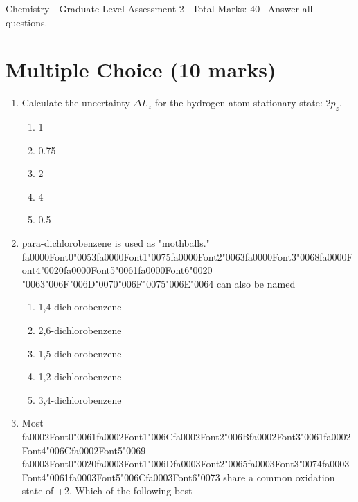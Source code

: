 \documentclass[12pt]{article}
\begin{document}
\begin{center}
Chemistry - Graduate Level Assessment 2 \
Total Marks: 40 \
Answer all questions.
\end{center}

\section*{Multiple Choice (10 marks)}
\begin{enumerate}[label=\arabic*.]
\item Calculate the uncertainty $\Delta L_z$ for the hydrogen-atom stationary state: $2 p_z$.
\begin{enumerate}[label=(\alph*)]
    \item 1
    \item 0.75
    \item 2
    \item 4
    \item 0.5
\end{enumerate}
\item para-dichlorobenzene is used as "mothballs." {\csname fa0000Font0\endcsname\char"0053}{\csname fa0000Font1\endcsname\char"0075}{\csname fa0000Font2\endcsname\char"0063}{\csname fa0000Font3\endcsname\char"0068}{\csname fa0000Font4\endcsname\char"0020}{\csname fa0000Font5\endcsname\char"0061}{\csname fa0000Font6\endcsname\char"0020} {\char"0063}{\char"006F}{\char"006D}{\char"0070}{\char"006F}{\char"0075}{\char"006E}{\char"0064} can also be named
\begin{enumerate}[label=(\alph*)]
    \item 1,4-dichlorobenzene
    \item 2,6-dichlorobenzene
    \item 1,5-dichlorobenzene
    \item 1,2-dichlorobenzene
    \item 3,4-dichlorobenzene
\end{enumerate}
\item Most {\csname fa0002Font0\endcsname\char"0061}{\csname fa0002Font1\endcsname\char"006C}{\csname fa0002Font2\endcsname\char"006B}{\csname fa0002Font3\endcsname\char"0061}{\csname fa0002Font4\endcsname\char"006C}{\csname fa0002Font5\endcsname\char"0069} {\csname fa0003Font0\endcsname\char"0020}{\csname fa0003Font1\endcsname\char"006D}{\csname fa0003Font2\endcsname\char"0065}{\csname fa0003Font3\endcsname\char"0074}{\csname fa0003Font4\endcsname\char"0061}{\csname fa0003Font5\endcsname\char"006C}{\csname fa0003Font6\endcsname\char"0073} share a common oxidation state of +2. Which of the following best

\end{enumerate}
\end{document}
